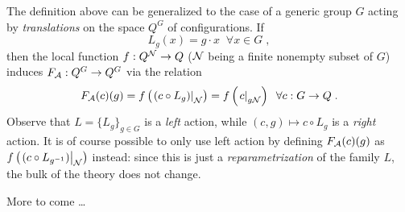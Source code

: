 \documentclass[12pt]{article}
\begin{document}
\medskip

The definition above can be generalized to the case
of a generic group $G$ acting by \emph{translations}
on the space $Q^G$ of configurations.
If
\begin{equation} \label{eq:transl}
L_g(x) = g \cdot x \;\; \forall x \in G \;,
\end{equation}
then the local function $f : Q^{\mathcal{N}} \to Q$
($\mathcal{N}$ being a finite nonempty subset of $G$)
induces $F_{\mathcal{A}} : Q^G \to Q^G$
via the relation
\begin{equation} \label{eq:glob-gen}
F_{\mathcal{A}}(c)(g)
= f \left( \left.{(c \circ L_g)}\right|_{\mathcal{N}} \right)
= f \left( \left.{c}\right|_{g\mathcal{N}} \right)
\;\; \forall c : G \to Q\;.
\end{equation}
Observe that $L = \{L_g\}_{g \in G}$ is a \emph{left} action,
while $(c,g) \mapsto c \circ L_g$ is a \emph{right} action.
It is of course possible to only use left action
by defining $F_{\mathcal{A}}(c)(g)$ as
\begin{math}
f \left( \left.{(c \circ L_{g^{-1}})}\right|_{\mathcal{N}} \right)
\end{math}
instead:
since this is just a \emph{reparametrization} of the family $L$,
the bulk of the theory does not change.

More to come \ldots

\end{document}
